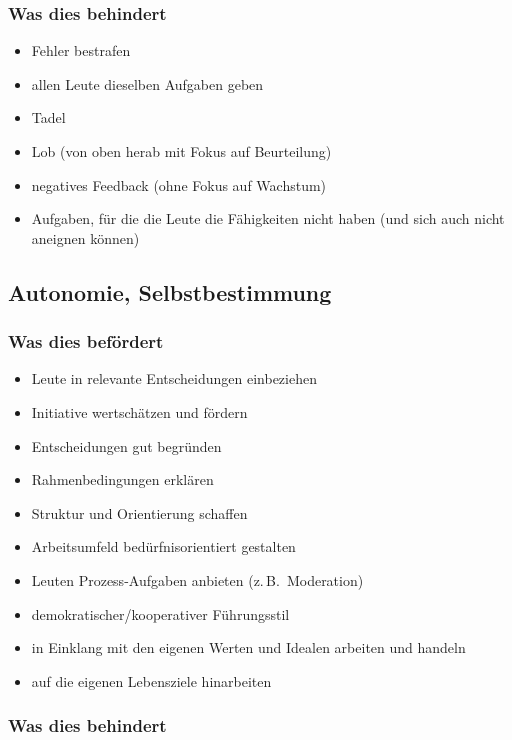 \subsubsection{Was dies behindert}

\begin{itemize}
    \item Fehler bestrafen
    \item allen Leute dieselben Aufgaben geben
    \item Tadel
    \item Lob (von oben herab mit Fokus auf Beurteilung)
    \item negatives Feedback (ohne Fokus auf Wachstum)
    \item Aufgaben, für die die Leute die Fähigkeiten nicht haben (und sich auch nicht aneignen können)
\end{itemize}

\subsection{Autonomie, Selbstbestimmung}

\subsubsection{Was dies befördert}

\begin{itemize}
    \item Leute in relevante Entscheidungen einbeziehen
    \item Initiative wertschätzen und fördern
    \item Entscheidungen gut begründen
    \item Rahmenbedingungen erklären
    \item Struktur und Orientierung schaffen
    \item Arbeitsumfeld bedürfnisorientiert gestalten
    \item Leuten Prozess-Aufgaben anbieten (z.\,B.~Moderation)
    \item demokratischer/kooperativer Führungsstil
    \item in Einklang mit den eigenen Werten und Idealen arbeiten und handeln
    \item auf die eigenen Lebensziele hinarbeiten
\end{itemize}

\subsubsection{Was dies behindert}


